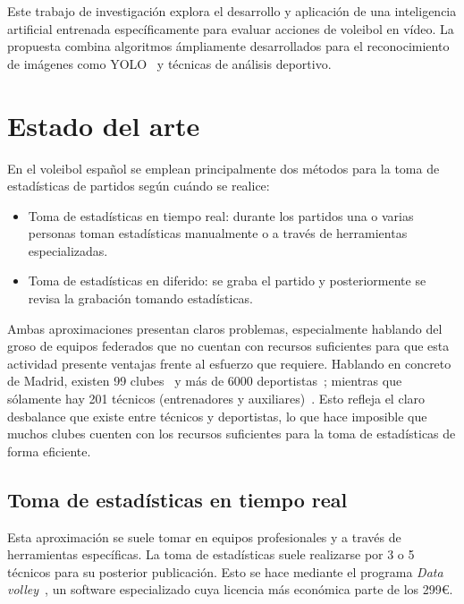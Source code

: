\documentclass[12pt]{report} %
\begin{document}
    Este trabajo de investigación explora el desarrollo y aplicación de una
    inteligencia artificial entrenada específicamente para evaluar acciones de
    voleibol en vídeo. La propuesta combina algoritmos ámpliamente
    desarrollados para el reconocimiento de imágenes como YOLO~\cite{YOLO} y
    técnicas de análisis deportivo.

 

    \chapter{Estado del arte}
    \label{chap:estadoarte}
    En el voleibol español se emplean principalmente dos
    métodos para la toma de estadísticas de partidos según cuándo se realice:
    \begin{itemize}
        \item Toma de estadísticas en tiempo real: durante los partidos una o
        varias personas toman estadísticas manualmente o a través de
        herramientas especializadas.
        \item Toma de estadísticas en diferido: se graba el partido y
        posteriormente se revisa la grabación tomando estadísticas.
    \end{itemize}

    Ambas aproximaciones presentan claros problemas, especialmente hablando del
    groso de equipos federados que no cuentan con recursos suficientes para que
    esta actividad presente ventajas frente al esfuerzo que requiere. Hablando
    en concreto de Madrid, existen 99 clubes~\cite{directorio-clubes} y más de
    6000 deportistas~\cite{estadisticasFEVB}; mientras que sólamente hay
    201 técnicos (entrenadores y auxiliares)~\cite{estadisticasFEVB}. Esto
    refleja el claro desbalance que existe entre técnicos y deportistas, lo que
    hace imposible que muchos clubes cuenten con los recursos suficientes para
    la toma de estadísticas de forma eficiente.

    \section{Toma de estadísticas en tiempo real}
    
    Esta aproximación se suele tomar en equipos profesionales y a través de
    herramientas específicas. La toma de estadísticas suele realizarse por 3 o
    5 técnicos para su posterior publicación. Esto se hace mediante el programa
    \textit{Data volley}~\cite{datavoley}, un software especializado cuya
    licencia más económica parte de los 299\euro. 
\end{document}

